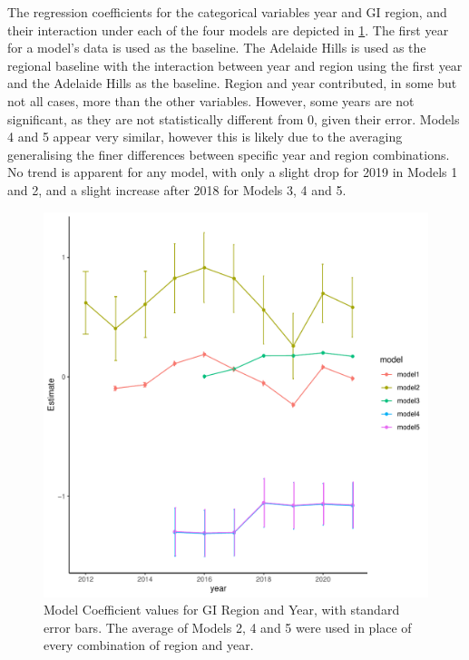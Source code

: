\documentclass[review,12pt,authoryear]{elsarticle}
\begin{document}
\begin{linenumbers}
\begin{table}[]
{\begin{tabular}{@{}cccccccc@{}}
      \end{tabular}      
  }
\end{table}

The regression coefficients for the categorical variables year and GI region, and their interaction under each of the four models are depicted in \ref{fig:yearly}. The first year for a model's data is used as the baseline. The Adelaide Hills is used as the regional baseline with the interaction between year and region using the first year and the Adelaide Hills as the baseline. Region and year contributed, in some but not all cases, more than the other variables. However, some years are not significant, as they are not statistically different from 0, given their error. Models 4 and 5 appear very similar, however this is likely due to the averaging generalising the finer differences between specific year and region combinations. No trend is apparent for any model, with only a slight drop for 2019 in Models 1 and 2, and a slight increase after 2018 for Models 3, 4 and 5.
\par
\begin{figure}
  \includegraphics{yearly_plots.pdf}
  \caption{Model Coefficient values for GI Region and Year, with standard error bars. The average of Models 2, 4 and 5 were used in place of every combination of region and year.}\label{fig:yearly}
  \end{figure}


\end{linenumbers}
\end{document}
